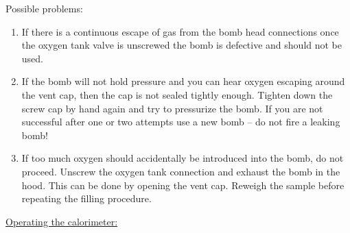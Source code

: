 \documentclass[byrevtex,amssymb,aps,pra,floatfix,letterpaper]{revtex4}
\begin{document}
Possible problems:

\begin{enumerate}

\item If there is a continuous escape of gas from the bomb head connections once the oxygen tank valve is unscrewed the bomb is defective and should not be used.

\item If the bomb will not hold pressure and you can hear oxygen escaping around the vent cap, then the cap is not sealed tightly enough. Tighten down the screw cap by hand again and try to pressurize the bomb. If you are not successful after one or two attempts use a new bomb -- do not fire a leaking bomb!

\item If too much oxygen should accidentally be introduced into the bomb, do not proceed. Unscrew the oxygen tank connection and exhaust the bomb in the hood. This can be done by opening the vent cap. Reweigh the sample before repeating the filling procedure.

\end{enumerate}

\underline{Operating the calorimeter:}\\
\end{document}
